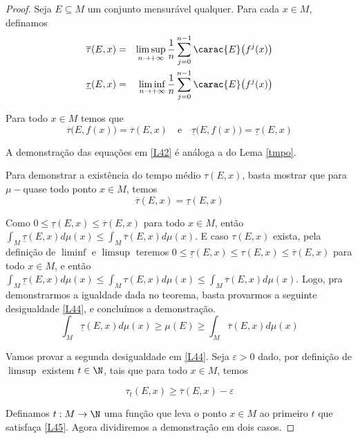 \begin{proof}
Seja $E\subseteq M$ um conjunto mensurável qualquer. Para cada $x\in M$, definamos
\begin{eqnarray*}
\overline{\tau}(E,x) & = & \limsup_{n\to+\infty}\dfrac{1}{n}\sum_{j=0}^{n-1}\carac{E}\big(f^j(x)\big)\\
\underline{\tau}(E,x) & = & \liminf_{n\to+\infty}\dfrac{1}{n}\sum_{j=0}^{n-1}\carac{E}\big(f^j(x)\big)
\end{eqnarray*}

Para todo $x\in M$ temos que
\begin{equation}\label{L42}
\overline{\tau}\big(E,f(x)\big)=\overline{\tau}(E,x)\quad\text{e}\quad\underline{\tau}\big(E,f(x)\big)=\underline{\tau}(E,x)
\end{equation}

A demonstração das equações em \eqref{L42} é análoga a do Lema \ref{tmpo}.

Para demonstrar a existência do tempo médio $\tau(E,x)$, basta mostrar que para $\mu-$quase todo ponto $x\in M$, temos
\begin{equation}
\overline{\tau}(E,x)=\underline{\tau}(E,x)
\end{equation}

Como $0\leq\underline{\tau}(E,x)\leq\overline{\tau}(E,x)$ para todo $x\in M$, então $\int_{M}\underline{\tau}(E,x)d\mu(x)\leq\int_{M}\overline{\tau}(E,x)d\mu(x)$. E caso $\tau(E,x)$ exista, pela definição de $\liminf$ e $\limsup$ teremos $0\leq\underline{\tau}(E,x)\leq\tau(E,x)\leq\overline{\tau}(E,x)$ para todo $x\in M$, e então $\int_{M}\underline{\tau}(E,x)d\mu(x)\leq\int_{M}\tau(E,x)d\mu(x)\leq\int_{M}\overline{\tau}(E,x)d\mu(x)$. Logo, pra demonstrarmos a igualdade dada no teorema, basta provarmos a seguinte desigualdade \eqref{L44}, e concluímos a demonstração.
\begin{equation}\label{L44}
\int_{M}\underline{\tau}(E,x)d\mu(x)\geq\mu(E)\geq\int_{M}\overline{\tau}(E,x)d\mu(x)
\end{equation}

Vamos provar a segunda desigualdade em \eqref{L44}. Seja $\varepsilon>0$ dado, por definição de $\limsup$ existem $t\in\N$, tais que para todo $x\in M$, temos

\vspace{-0.5cm}\begin{equation}\label{L45}
\tau_t(E,x)\geq\overline{\tau}(E,x)-\varepsilon
\end{equation}

Definamos $t:M \rightarrow \N$ uma função que leva o ponto $x\in M$ ao primeiro $t$ que satisfaça \eqref{L45}. Agora dividiremos a demonstração em dois casos.


\end{proof}
